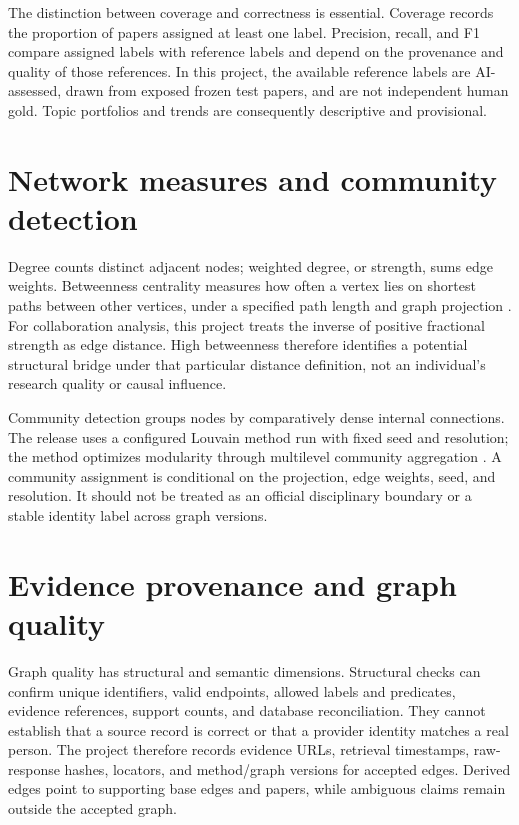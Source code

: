 The distinction between coverage and correctness is essential. Coverage records
the proportion of papers assigned at least one label. Precision, recall, and F1
compare assigned labels with reference labels and depend on the provenance and
quality of those references. In this project, the available reference labels are
AI-assessed, drawn from exposed frozen test papers, and are not independent human
gold. Topic portfolios and trends are consequently descriptive and provisional.

\section{Network measures and community detection}

Degree counts distinct adjacent nodes; weighted degree, or strength, sums edge
weights. Betweenness centrality measures how often a vertex lies on shortest
paths between other vertices, under a specified path length and graph projection
\citep{freeman1977betweenness}. For collaboration analysis, this project treats
the inverse of positive fractional strength as edge distance. High betweenness
therefore identifies a potential structural bridge under that particular
distance definition, not an individual's research quality or causal influence.

Community detection groups nodes by comparatively dense internal connections.
The release uses a configured Louvain method run with fixed seed and resolution;
the method optimizes modularity through multilevel community aggregation
\citep{blondel2008communities}. A community assignment is conditional on the
projection, edge weights, seed, and resolution. It should not be treated as an
official disciplinary boundary or a stable identity label across graph versions.

\section{Evidence provenance and graph quality}

Graph quality has structural and semantic dimensions. Structural checks can
confirm unique identifiers, valid endpoints, allowed labels and predicates,
evidence references, support counts, and database reconciliation. They cannot
establish that a source record is correct or that a provider identity matches a
real person. The project therefore records evidence URLs, retrieval timestamps,
raw-response hashes, locators, and method/graph versions for accepted edges.
Derived edges point to supporting base edges and papers, while ambiguous claims
remain outside the accepted graph.

